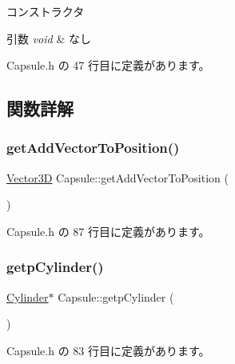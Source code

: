 コンストラクタ 


\begin{DoxyParams}{引数}
{\em void} & なし \\
\hline
\end{DoxyParams}


 Capsule.\+h の 47 行目に定義があります。



\subsection{関数詳解}
\mbox{\label{class_capsule_a32991dc5e0331f716302ce73a8f9fd2f}} 
\subsubsection{\texorpdfstring{get\+Add\+Vector\+To\+Position()}{getAddVectorToPosition()}}
{\footnotesize\ttfamily \mbox{\hyperlink{class_vector3_d}{Vector3D}} Capsule\+::get\+Add\+Vector\+To\+Position (\begin{DoxyParamCaption}{ }\end{DoxyParamCaption})\hspace{0.3cm}{\ttfamily [inline]}}



 Capsule.\+h の 87 行目に定義があります。

\mbox{\label{class_capsule_ae5826ff4d2d894c8e0d0bd65de5f05ca}} 
\subsubsection{\texorpdfstring{getp\+Cylinder()}{getpCylinder()}}
{\footnotesize\ttfamily \mbox{\hyperlink{class_cylinder}{Cylinder}}$\ast$ Capsule\+::getp\+Cylinder (\begin{DoxyParamCaption}{ }\end{DoxyParamCaption})\hspace{0.3cm}{\ttfamily [inline]}}



 Capsule.\+h の 83 行目に定義があります。

\mbox{\label{class_capsule_a84ddec064afb6b2fff155a10e9e26191}} 
